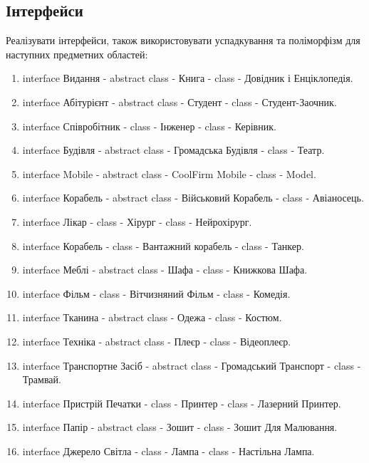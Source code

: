 \documentclass[]{article}
\begin{document}
\subsection{Інтерфейси}
 Реалізувати інтерфейси, також використовувати успадкування та поліморфізм для наступних предметних областей:
\begin{enumerate}
\def\labelenumi{7.\arabic{enumi}.}

\item  interface Видання - abstract class - Книга - class - Довідник і Енціклопедія.
\item  interface Абітурієнт  - abstract class - Студент  - class - Студент-Заочник.
\item  interface Співробітник  - class - Інженер  - class - Керівник.
\item  interface Будівля  - abstract class - Громадська Будівля  - class - Театр.
\item  interface Mobile  - abstract class - CoolFirm Mobile  - class - Model.
\item  interface Корабель  - abstract class - Військовий Корабель  - class - Авіаносець.
\item  interface Лікар  - class - Хірург  - class - Нейрохірург.
\item  interface Корабель  - class - Вантажний корабель  - class - Танкер.
\item  interface Меблі  - abstract class - Шафа  - class - Книжкова Шафа.
\item  interface Фільм  - class - Вітчизняний Фільм  - class - Комедія.
\item  interface Тканина  - abstract class - Одежа - class - Костюм.
\item  interface Техніка  - abstract class - Плеєр  - class - Відеоплеєр.
\item  interface Транспортне Засіб  - abstract class - Громадський Транспорт  - class - Трамвай.
\item  interface Пристрій Печатки  - class - Принтер  - class - Лазерний Принтер.
\item  interface Папір  - abstract class - Зошит  - class - Зошит Для Малювання.
\item  interface Джерело Світла  - class - Лампа  - class - Настільна Лампа.
\end{enumerate}
\end{document}
